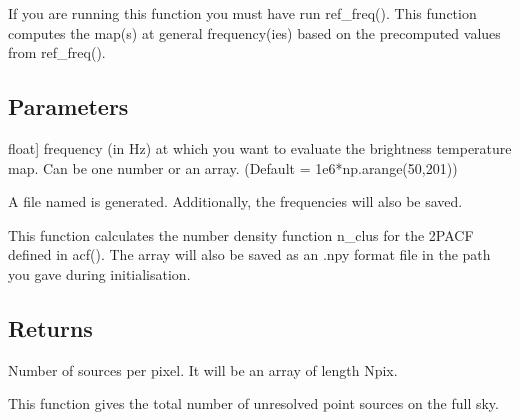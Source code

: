 \documentclass[letterpaper,10pt,english]{sphinxmanual}
\begin{document}
\begin{fulllineitems}
\begin{fulllineitems}
\sphinxAtStartPar
If you are running this function you must have run ref\_freq().    
This function computes the map(s) at general frequency(ies) based on the precomputed values from ref\_freq().


\subsection{Parameters}
\label{\detokenize{api:id3}}\begin{description}
\sphinxlineitem{nu}{[}float{]}
\sphinxAtStartPar
frequency (in Hz) at which you want to evaluate the brightness temperature map. Can be one number or an array.
(Default = 1e6*np.arange(50,201))

\end{description}

\sphinxAtStartPar
A file named  is generated.
Additionally, the frequencies will also be saved.

\end{fulllineitems}


\begin{fulllineitems}
\label{\detokenize{api:furs.furs.num_den}}
\pysigstartsignatures
{}
\pysigstopsignatures
\sphinxAtStartPar
This function calculates the number density function n\_clus for the 2PACF defined in acf().
The array will also be saved as an .npy format file in the path you gave during initialisation.


\subsection{Returns}
\label{\detokenize{api:id4}}\begin{description}
\sphinxAtStartPar
Number of sources per pixel. It will be an array of length Npix.

\end{description}

\end{fulllineitems}


\begin{fulllineitems}
\label{\detokenize{api:furs.furs.num_sources}}
\pysigstartsignatures
{}
\pysigstopsignatures
\sphinxAtStartPar
This function gives the total number of unresolved point sources on the full sky.


\end{fulllineitems}
\end{fulllineitems}
\end{document}
